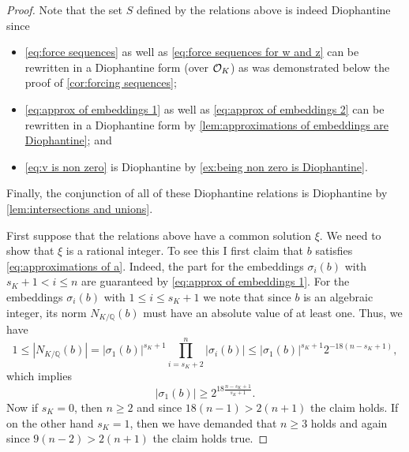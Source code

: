 \begin{proof}
  Note that the set \(S\) defined by the relations above is indeed Diophantine
  since
  \begin{itemize}
    \item \eqref{eq:force sequences} as well as \eqref{eq:force sequences for w
    and z} can be rewritten in a Diophantine form (over \(\mathcal{O}_{K}\)) as was
    demonstrated below the proof of \cref{cor:forcing sequences};

    \item \eqref{eq:approx of embeddings 1} as well as \eqref{eq:approx of
    embeddings 2} can be rewritten in a Diophantine form by
    \cref{lem:approximations of embeddings are Diophantine}; and

    \item \eqref{eq:v is non zero} is Diophantine by \cref{ex:being non zero is
    Diophantine}.
  \end{itemize}
  Finally, the conjunction of all of these Diophantine relations is Diophantine
  by \cref{lem:intersections and unions}.

  First suppose that the relations above have a common solution \(ξ\). We need
  to show that \(ξ\) is a rational integer. To see this I first claim that \(b\)
  satisfies \eqref{eq:approximations of a}. Indeed, the part for the embeddings
  \(σ_i(b)\) with \(s_K + 1 < i ≤ n\) are guaranteed by \eqref{eq:approx of
  embeddings 1}. For the embeddings \(σ_i(b)\) with \(1 ≤ i ≤ s_K + 1\) we note
  that since \(b\) is an algebraic integer, its norm \(N_{K/ℚ}(b)\) must have an
  absolute value of at least one. Thus, we have
  \[
    1 ≤ |N_{K/ℚ}(b)| = |σ_1(b)|^{s_K + 1} \prod_{i = s_K + 2}^n |σ_i(b)| ≤
      |σ_1(b)|^{s_K + 1} 2^{-18 (n - s_K + 1)},
  \]
  which implies
  \[
    |σ_1(b)| ≥ 2^{18 \frac{n - s_K + 1}{s_K + 1}}.
  \]
  Now if \(s_K = 0\), then \(n ≥ 2\) and since \(18 (n - 1) > 2 (n + 1)\) the
  claim holds. If on the other hand \(s_K = 1\), then we have demanded that \(n
  ≥ 3\) holds and again since \(9 (n - 2) > 2(n + 1)\) the claim holds true.


\end{proof}
